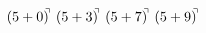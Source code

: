 \documentclass[preview]{standalone}
\begin{document}
\begin{align*}
(5+0)^{\hspace{-0.1cm}\urcorner} \ (5+3)^{\hspace{-0.1cm}\urcorner} \ (5+7)^{\hspace{-0.1cm}\urcorner} \ (5+9)^{\hspace{-0.1cm}\urcorner}
\end{align*}
\end{document}

